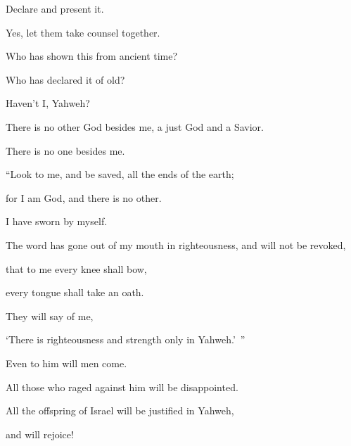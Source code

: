 {\par }{\Q {}Declare and present it.
\par }{\QB Yes, let them take counsel together.
\par }{\Q Who has shown this from ancient time?
\par }{\QB Who has declared it of old?
\par }{\QB Haven’t I, Yahweh?
\par }{\Q There is no other God besides me, a just God and a Savior.
\par }{\QB There is no one besides me.
\par }{\BB \par }{\Q {}“Look to me, and be saved, all the ends of the earth;
\par }{\QB for I am God, and there is no other.
\par }{\Q {}I have sworn by myself.
\par }{\QB The word has gone out of my mouth in righteousness, and will not be revoked,
\par }{\Q that to me every knee shall bow,
\par }{\QB every tongue shall take an oath.
\par }{\Q {}They will say of me,
\par }{\QB ‘There is righteousness and strength only in Yahweh.’ ”
\par }{\Q Even to him will men come.
\par }{\QB All those who raged against him will be disappointed.
\par }{\Q {}All the offspring of Israel will be justified in Yahweh,
\par }{\QB and will rejoice!

}
